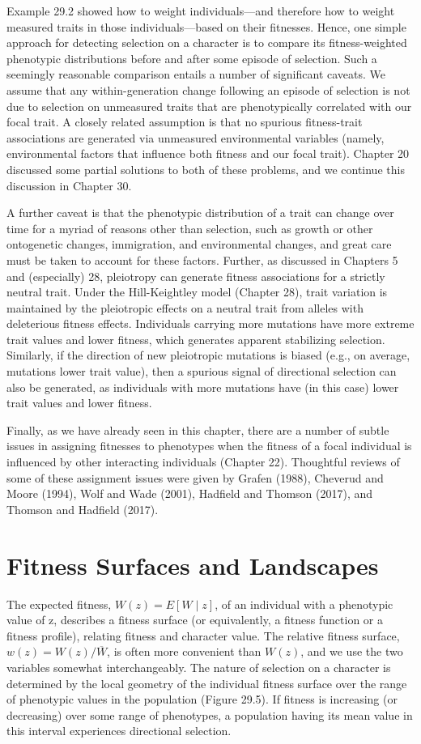 \documentclass{article}
\begin{document}
Example 29.2 showed how to weight individuals—and therefore how to weight measured traits in those individuals—based on their fitnesses. Hence, one simple approach for detecting selection on a character is to compare its fitness-weighted phenotypic distributions before and after some episode of selection. Such a seemingly reasonable comparison entails a number of significant caveats. We assume that any within-generation change following an episode of selection is not due to selection on unmeasured traits that are phenotypically correlated with our focal trait. A closely related assumption is that no spurious fitness-trait associations are generated via unmeasured environmental variables (namely, environmental factors that influence both fitness and our focal trait). Chapter 20 discussed some partial solutions to both of these problems, and we continue this discussion in Chapter 30.

A further caveat is that the phenotypic distribution of a trait can change over time for a myriad of reasons other than selection, such as growth or other ontogenetic changes, immigration, and environmental changes, and great care must be taken to account for these factors. Further, as discussed in Chapters 5 and (especially) 28, pleiotropy can generate fitness associations for a strictly neutral trait. Under the Hill-Keightley model (Chapter 28), trait variation is maintained by the pleiotropic effects on a neutral trait from alleles with deleterious fitness effects. Individuals carrying more mutations have more extreme trait values and lower fitness, which generates apparent stabilizing selection. Similarly, if the direction of new pleiotropic mutations is biased (e.g., on average, mutations lower trait value), then a spurious signal of directional selection can also be generated, as individuals with more mutations have (in this case) lower trait values and lower fitness.

Finally, as we have already seen in this chapter, there are a number of subtle issues in assigning fitnesses to phenotypes when the fitness of a focal individual is influenced by other interacting individuals (Chapter 22). Thoughtful reviews of some of these assignment issues were given by Grafen (1988), Cheverud and Moore (1994), Wolf and Wade (2001), Hadfield and Thomson (2017), and Thomson and Hadfield (2017).

\section{Fitness Surfaces and Landscapes}
The expected fitness,  $ W(z) = E[W \mid z] $, of an individual with a phenotypic value of z, describes a fitness surface (or equivalently, a fitness function or a fitness profile), relating fitness and character value. The relative fitness surface,  $ w(z) = W(z)/\overline{W} $, is often more convenient than  $ W(z) $, and we use the two variables somewhat interchangeably. The nature of selection on a character is determined by the local geometry of the individual fitness surface over the range of phenotypic values in the population (Figure 29.5). If fitness is increasing (or decreasing) over some range of phenotypes, a population having its mean value in this interval experiences directional selection.
\end{document}
